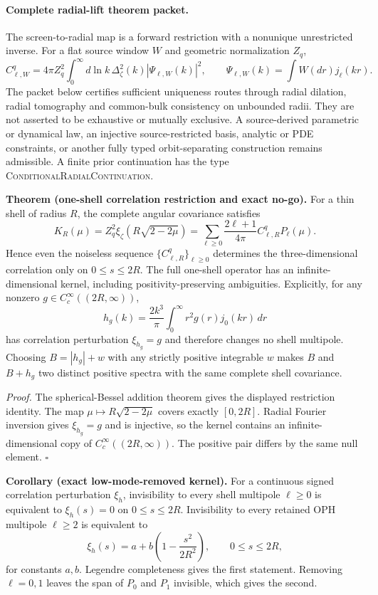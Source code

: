 
\paragraph{Complete radial-lift theorem packet.}
\label{par:oph330-complete-radial-lift}
The screen-to-radial map is a forward restriction with a nonunique unrestricted inverse.
For a flat source window $W$ and geometric normalization $Z_q$,
\[
 C_{\ell,W}^q
 =4\pi Z_q^2\int_0^\infty d\ln k\,
 \Delta_\zeta^2(k)|\Psi_{\ell,W}(k)|^2,
 \qquad
 \Psi_{\ell,W}(k)=\int W(dr)j_\ell(kr).
\]
The packet below certifies sufficient uniqueness routes through radial dilation,
radial tomography and common-bulk consistency on unbounded radii.
They are not asserted to be exhaustive or mutually
exclusive. A source-derived parametric or dynamical law, an injective
source-restricted basis, analytic or PDE constraints, or another fully typed
orbit-separating construction remains admissible. A finite prior continuation
has the type \textsc{ConditionalRadialContinuation}.

\textbf{Theorem (one-shell correlation restriction and exact no-go).}
\label{thm:oph330-shell-correlation-restriction}
For a thin shell of radius $R$, the complete angular covariance satisfies
\[
 K_R(\mu)
 =Z_q^2\xi_\zeta\!\left(R\sqrt{2-2\mu}\right)
 =\sum_{\ell\ge0}\frac{2\ell+1}{4\pi}C_{\ell,R}^qP_\ell(\mu).
\]
Hence even the noiseless sequence $\{C_{\ell,R}^q\}_{\ell\ge0}$ determines the
three-dimensional correlation only on $0\le s\le2R$.  The full one-shell
operator has an infinite-dimensional kernel, including positivity-preserving
ambiguities.  Explicitly, for any nonzero
$g\in C_c^\infty((2R,\infty))$,
\[
 h_g(k)=\frac{2k^3}{\pi}\int_0^\infty r^2g(r)j_0(kr)\,dr
\]
has correlation perturbation $\xi_{h_g}=g$ and therefore changes no shell
multipole.  Choosing $B=|h_g|+w$ with any strictly positive integrable $w$ makes
$B$ and $B+h_g$ two distinct positive spectra with the same complete shell
covariance.

\textit{Proof.}
The spherical-Bessel addition theorem gives the displayed restriction identity.
The map $\mu\mapsto R\sqrt{2-2\mu}$ covers exactly $[0,2R]$.  Radial Fourier
inversion gives $\xi_{h_g}=g$ and is injective, so the kernel contains an
infinite-dimensional copy of $C_c^\infty((2R,\infty))$.  The positive pair differs
by the same null element.  \hfill$\square$

\textbf{Corollary (exact low-mode-removed kernel).}
\label{cor:oph330-low-mode-shell-kernel}
For a continuous signed correlation perturbation \(\xi_h\), invisibility to
every shell multipole \(\ell\ge0\) is equivalent to
\(\xi_h(s)=0\) on \(0\le s\le2R\). Invisibility to every retained OPH
multipole \(\ell\ge2\) is equivalent to
\[
\xi_h(s)=a+b\left(1-\frac{s^2}{2R^2}\right),
\qquad 0\le s\le2R,
\]
for constants \(a,b\). Legendre completeness gives the first statement.
Removing \(\ell=0,1\) leaves the span of \(P_0\) and \(P_1\) invisible, which
gives the second.


